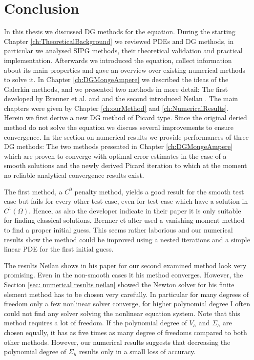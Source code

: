 \section{Conclusion}

In this thesis we discussed DG methods for the \MA equation. During the starting Chapter \ref{ch:TheoreticalBackground} we reviewed PDEs and DG methods, in particular we analysed SIPG methods, their theoretical validation and practical implementation.
Afterwards we introduced the \MA equation, collect information about its main properties and gave an overview over existing numerical methods to solve it. In Chapter \ref{ch:DGMongeAmpere} we described the ideas of the Galerkin methods, and  we presented two methods in more detail: The first developed by Brenner et al. \cite{BGN+2011} and and the second introduced Neilan \cite{Neilan2014}.
The main chapters were given by Chapter \ref{ch:ourMethod} and \ref{ch:NumericalResults}. Herein we first derive a new DG method of Picard type. Since the original deried method do not solve the \MA equation we discuss several improvements to ensure convergence. 
In the section on numerical results we provide performances of three DG methods: The two methods presented in Chapter \ref{ch:DGMongeAmpere} which are proven to converge with optimal error estimates in the case of a smooth solutions and the newly derived Picard iteration to which at the moment no reliable analytical convergence results exist.

The first method, a $C^0$ penalty method, yields a good result for the smooth test case but fails for every other test case, even for test case which have a solution in $C^1(\Omega)$. Hence, as also the developer indicate in their paper it is only suitable for finding classical solutions.
Brenner et alter used a vanishing moment method to find a proper initial guess. This seems rather laborious and our numerical results show the method could be improved using a nested iterations and a simple linear PDE for the first initial guess.

The results Neilan shows in his paper for our second examined method look very promising. Even in the non-smooth cases it his method converges. However, the Section \ref{sec: numerical results neilan} showed the Newton solver for his finite element method has to be chosen very carefully. In particular for many degrees of freedom only a few nonlinear solver converge, for higher polynomial degree I often could not find any solver solving the nonlinear equation system.
Note that this method requires a lot of freedom. If the polynomial degree of $V_h$ and $\Sigma_h$ are chosen equally, it has as five times as many degree of freedoms compared to both other methods. However, our numerical results suggests that decreasing the polynomial degree of $\Sigma_h$ results only in a small loss of accuracy.

